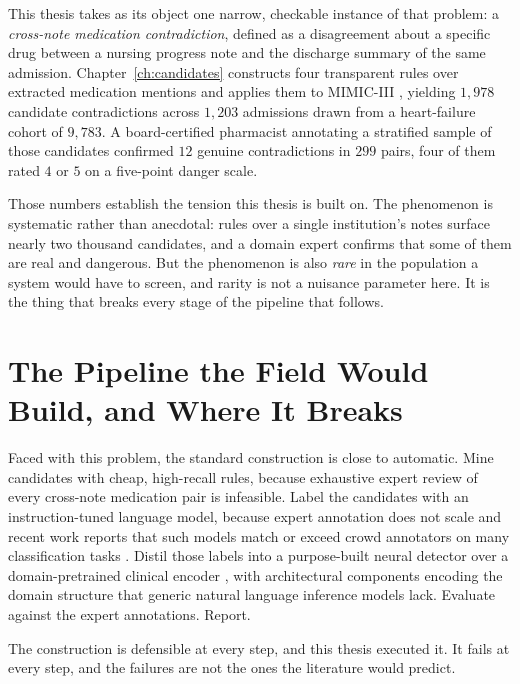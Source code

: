 This thesis takes as its object one narrow, checkable instance of that problem:
a \emph{cross-note medication contradiction}, defined as a disagreement about a
specific drug between a nursing progress note and the discharge summary of the
same admission. Chapter~\ref{ch:candidates} constructs four transparent rules
over extracted medication mentions and applies them to MIMIC-III
\citep{johnson2016mimic}, yielding $1{,}978$ candidate contradictions across
$1{,}203$ admissions drawn from a heart-failure cohort of $9{,}783$. A
board-certified pharmacist annotating a stratified sample of those candidates
confirmed $12$ genuine contradictions in $299$ pairs, four of them rated $4$ or
$5$ on a five-point danger scale.

Those numbers establish the tension this thesis is built on. The phenomenon is
systematic rather than anecdotal: rules over a single institution's notes
surface nearly two thousand candidates, and a domain expert confirms that some
of them are real and dangerous. But the phenomenon is also \emph{rare} in the
population a system would have to screen, and rarity is not a nuisance
parameter here. It is the thing that breaks every stage of the pipeline that
follows.

\section{The Pipeline the Field Would Build, and Where It Breaks}
\label{sec:intro-gap}

Faced with this problem, the standard construction is close to automatic. Mine
candidates with cheap, high-recall rules, because exhaustive expert review of
every cross-note medication pair is infeasible. Label the candidates with an
instruction-tuned language model, because expert annotation does not scale and
recent work reports that such models match or exceed crowd annotators on many
classification tasks \citep{gilardi2023chatgpt}. Distil those labels into a
purpose-built neural detector over a domain-pretrained clinical encoder
\citep{gu2021biomedbert,alsentzer2019clinicalbert}, with architectural
components encoding the domain structure that generic natural language
inference models lack. Evaluate against the expert annotations. Report.

The construction is defensible at every step, and this thesis executed it. It
fails at every step, and the failures are not the ones the literature would
predict.

